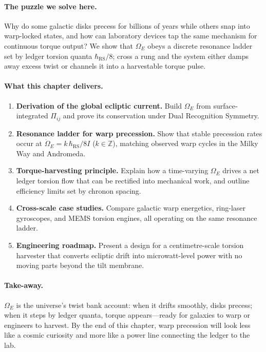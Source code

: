 \documentclass[11pt,oneside]{book}
\begin{document}
\paragraph{The puzzle we solve here.}
Why do some galactic disks precess for billions of years while others
snap into warp-locked states, and how can laboratory devices tap the
same mechanism for continuous torque output?  
We show that \(\Omega_{E}\) obeys a discrete resonance ladder set by
ledger torsion quanta \(\hbar_{\mathrm{RS}}/8\); cross a rung and the
system either damps away excess twist or channels it into a harvestable
torque pulse.

\paragraph{What this chapter delivers.}

\begin{enumerate}[label=\arabic*.,leftmargin=*,itemsep=3pt]
\item \textbf{Derivation of the global ecliptic current.}  
      Build \(\Omega_{E}\) from surface‐integrated \(\Pi_{ij}\) and
      prove its conservation under Dual Recognition Symmetry.
\item \textbf{Resonance ladder for warp precession.}  
      Show that stable precession rates occur at
      \(\dot{\Omega}_{E}=k\,\hbar_{\mathrm{RS}}/8I\)
      (\(k\in\mathbb Z\)), matching observed warp cycles in the
      Milky Way and Andromeda.
\item \textbf{Torque-harvesting principle.}  
      Explain how a time-varying \(\Omega_{E}\) drives a net ledger
      torsion flow that can be rectified into mechanical work, and
      outline efficiency limits set by chronon spacing.
\item \textbf{Cross-scale case studies.}  
      Compare galactic warp energetics, ring-laser gyroscopes, and
      MEMS torsion engines, all operating on the same resonance
      ladder.
\item \textbf{Engineering roadmap.}  
      Present a design for a centimetre-scale torsion harvester that
      converts ecliptic drift into microwatt-level power with no
      moving parts beyond the tilt membrane.
\end{enumerate}

\paragraph{Take-away.}
\(\Omega_{E}\) is the universe’s twist bank account: when it drifts
smoothly, disks precess; when it steps by ledger quanta, torque
appears—ready for galaxies to warp or engineers to harvest.  By the
end of this chapter, warp precession will look less like a cosmic
curiosity and more like a power line connecting the ledger to the
lab.
\end{document}
